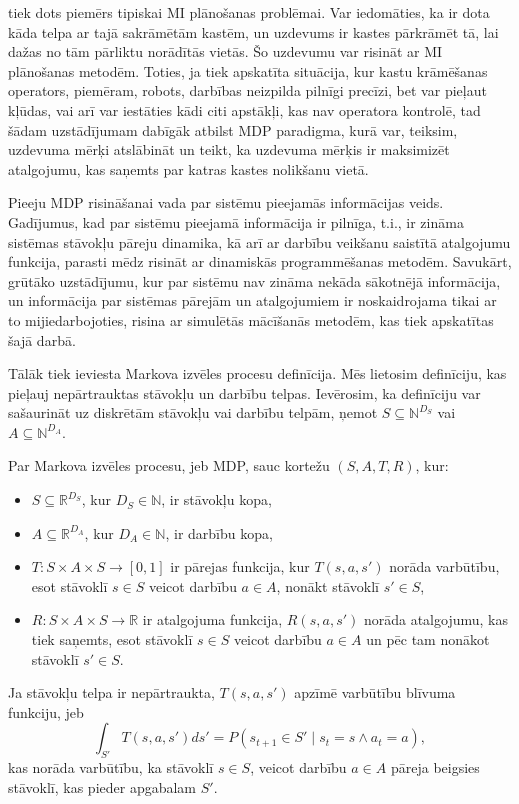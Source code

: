 \documentclass{ludis} %
\begin{document}
\autocite{Otterlo} tiek dots piemērs tipiskai MI plānošanas problēmai. Var iedomāties, ka ir dota kāda telpa ar tajā sakrāmētām kastēm, un uzdevums ir kastes pārkrāmēt tā, lai dažas no tām pārliktu norādītās vietās.
Šo uzdevumu var risināt ar MI plānošanas metodēm.
Toties, ja tiek apskatīta situācija, kur kastu krāmēšanas operators, piemēram, robots, darbības neizpilda pilnīgi precīzi, bet var pieļaut kļūdas, vai arī var iestāties kādi citi apstākļi, kas nav operatora kontrolē, tad šādam uzstādījumam dabīgāk atbilst MDP paradigma, kurā var, teiksim, uzdevuma mērķi atslābināt un teikt, ka uzdevuma mērķis ir maksimizēt atalgojumu, kas saņemts par katras kastes nolikšanu vietā.

Pieeju MDP risināšanai vada par sistēmu pieejamās informācijas veids.
Gadījumus, kad par sistēmu pieejamā informācija ir pilnīga, t.i., ir zināma sistēmas stāvokļu pāreju dinamika, kā arī ar darbību veikšanu saistītā atalgojumu funkcija, parasti mēdz risināt ar dinamiskās programmēšanas metodēm.
Savukārt, grūtāko uzstādījumu, kur par sistēmu nav zināma nekāda sākotnējā informācija, un informācija par sistēmas pārejām un atalgojumiem ir noskaidrojama tikai ar to mijiedarbojoties, risina ar simulētās mācīšanās metodēm, kas tiek apskatītas šajā darbā.

Tālāk tiek ieviesta Markova izvēles procesu definīcija. Mēs lietosim definīciju, kas pieļauj nepārtrauktas stāvokļu un darbību telpas. Ievērosim, ka definīciju var sašaurināt uz diskrētām stāvokļu vai darbību telpām, ņemot $S \subseteq \mathbb{N}^{D_S}$ vai $A \subseteq \mathbb{N}^{D_A}$.

\begin{definicija}
Par Markova izvēles procesu, jeb MDP, sauc kortežu $(S, A, T, R)$, kur:
\begin{itemize}
	\item $S \subseteq \mathbb{R}^{D_S}$, kur $D_S \in \mathbb{N}$, ir stāvokļu kopa, %
	\item $A \subseteq \mathbb{R}^{D_A}$, kur $D_A \in \mathbb{N}$, ir darbību kopa, %
	\item $T:S \times A \times S \rightarrow [0,1]$ ir pārejas funkcija, kur $T(s, a, s')$ norāda varbūtību, esot stāvoklī $s \in S$ veicot darbību $a \in A$, nonākt stāvoklī $s' \in S$,
	\item $R:S \times A \times S \rightarrow \mathbb{R}$ ir atalgojuma funkcija, $R(s, a, s')$ norāda atalgojumu, kas tiek saņemts, esot stāvoklī $s \in S$ veicot darbību $a \in A$ un pēc tam nonākot stāvoklī $s' \in S$.
\end{itemize}
Ja stāvokļu telpa ir nepārtraukta, $T(s, a, s')$ apzīmē varbūtību blīvuma funkciju, jeb
\[
	\int_{S'} T(s, a, s')ds' = P(s_{t+1} \in S' \mid s_t = s \land a_t = a),
\]
kas norāda varbūtību, ka stāvoklī $s \in S$, veicot darbību $a \in A$ pāreja beigsies stāvoklī, kas pieder apgabalam $S'$. %
\end{definicija}
\end{document}
